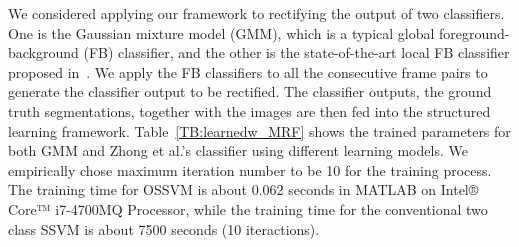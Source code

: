\documentclass[10pt,journal,compsoc]{newIEEEtran}
\begin{document}
We considered applying our framework to rectifying the output of two classifiers. One is the Gaussian mixture model (GMM), which is a typical global foreground-background (FB) classifier, and the other is the state-of-the-art local FB classifier proposed in~\cite{Zhong2012UDC_SIGGRAPHAsia}. We apply the FB classifiers to all the consecutive frame pairs to generate the classifier output to be rectified. The classifier outputs, the ground truth segmentations, together with the images are then fed into the structured learning framework. Table~\ref{TB:learnedw_MRF} shows the trained parameters for both GMM and Zhong et al.'s classifier using different learning models. We empirically chose maximum iteration number to be 10 for the training process. The training time for OSSVM is about 0.062 seconds in MATLAB on Intel® Core™ i7-4700MQ Processor, while the training time for the conventional two class SSVM is about 7500 seconds (10 iteractions). 
\end{document}
